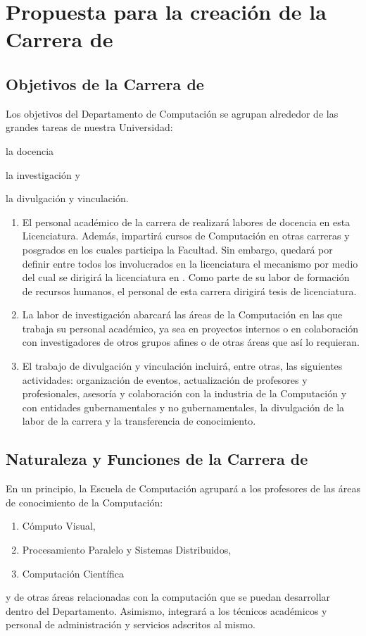 \section{Propuesta para la creación de la Carrera de \SchoolShortName}\label{sec:cs-prop-carr-cscomp}

\subsection{Objetivos de la Carrera de \SchoolShortName}
Los objetivos del Departamento de Computación se agrupan alrededor de las grandes tareas de nuestra Universidad:
\begin{inparaenum}[ a) ]
\item la docencia
\item la investigación y 
\item la divulgación y vinculación.
\end{inparaenum}

\begin{enumerate}
\item El personal académico de la carrera de \SchoolShortName realizará labores de docencia en esta Licenciatura. Además, impartirá cursos de Computación en otras carreras y posgrados en los cuales participa la Facultad. Sin embargo, quedará por definir entre todos los involucrados en la licenciatura el mecanismo por medio del cual se dirigirá la licenciatura en \SchoolShortName. Como parte de su labor de formación de recursos humanos, el personal de esta carrera dirigirá tesis de licenciatura.

\item La labor de investigación abarcará las áreas de la Computación en las que trabaja su personal académico, ya sea en proyectos internos o en colaboración con investigadores de otros grupos afines o de otras áreas que así lo requieran.

\item El trabajo de divulgación y vinculación incluirá, entre otras, las siguientes actividades: organización de eventos, actualización de profesores y profesionales, asesoría y colaboración con la industria de la Computación y con entidades gubernamentales y no gubernamentales, la divulgación de la labor de la carrera y la transferencia de conocimiento.
\end{enumerate}

\subsection{Naturaleza y Funciones de la Carrera de \SchoolShortName}
En un principio, la Escuela de Computación agrupará a los profesores de las áreas de conocimiento de la Computación:
\begin{enumerate}[ a) ]
\item Cómputo Visual,
\item Procesamiento Paralelo y Sistemas Distribuidos,
\item Computación Científica
\end{enumerate}
y de otras áreas relacionadas con la computación que se puedan desarrollar dentro del Departamento. Asimismo, integrará a los técnicos académicos y personal de administración y servicios adscritos al mismo.

